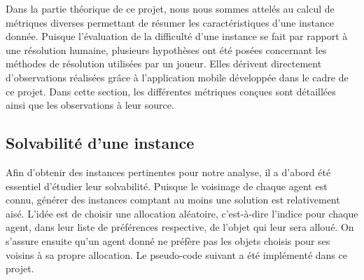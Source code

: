 \documentclass[a4paper, 11pt]{article}
\begin{document}
	Dans la partie théorique de ce projet, nous nous sommes attelés au calcul de métriques diverses permettant de résumer les caractéristiques d'une instance donnée. Puisque l'évaluation de la difficulté d'une instance se fait par rapport à une résolution humaine, plusieurs hypothèses ont été posées concernant les méthodes de résolution utilisées par un joueur. Elles dérivent directement d'observations réalisées grâce à l'application mobile développée dans le cadre de ce projet. Dans cette section, les différentes métriques conçues sont détaillées ainsi que les observations à leur source.
	
	\subsection{Solvabilité d'une instance}
	Afin d'obtenir des instances pertinentes pour notre analyse, il a d'abord été essentiel d'étudier leur solvabilité. Puisque le voisinage de chaque agent est connu, générer des instances comptant au moins une solution est relativement aisé. L'idée est de choisir une allocation aléatoire, c'est-à-dire l'indice pour chaque agent, dans leur liste de préférences respective, de l'objet qui leur sera alloué. On s'assure ensuite qu'un agent donné ne préfère pas les objets choisis pour ses voisins à sa propre allocation. Le pseudo-code suivant a été implémenté dans ce projet. 
\end{document}
